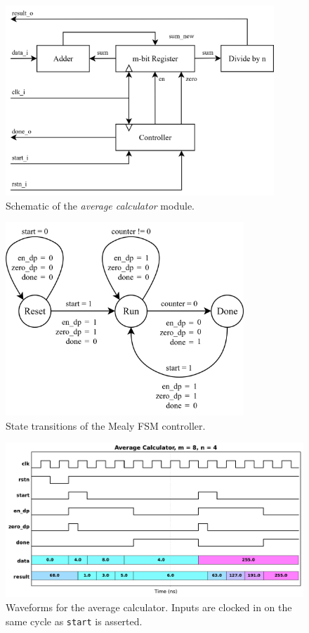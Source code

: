 \documentclass[../main.tex]{subfiles}
\begin{document}
\begin{figure}[H]
    \centering
    \includegraphics[width=0.9\textwidth]{assets/q4.png}
    \caption{Schematic of the \textit{average calculator} module.}
    \label{fig:q4}
\end{figure}


\begin{figure}[H]
    \centering
    \includegraphics[width=0.8\textwidth]{assets/q4_controller.png}
    \caption{State transitions of the Mealy FSM controller.}
    \label{fig:q4_controller}
\end{figure}

\newpage

\begin{figure}[h]
    \centering
    \includegraphics[width=\textwidth]{assets/q4_wave.pdf}
    \caption{Waveforms for the average calculator. Inputs are clocked in on the same cycle as \lstinline{start} is asserted.}
    \label{fig:q4_wave}
\end{figure}
\end{document}
